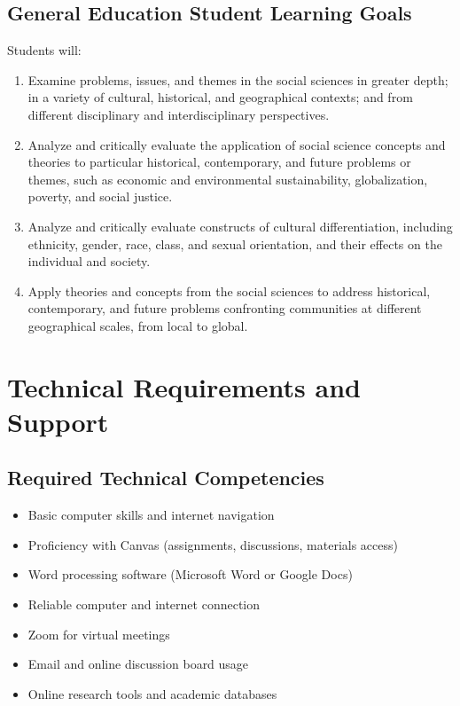 \documentclass[11pt]{scrartcl} %
\begin{document}
\subsection{General Education Student Learning Goals}
Students will:
\begin{enumerate}
\item Examine problems, issues, and themes in the social sciences in greater depth; in a variety of cultural, historical, and geographical contexts; and from different disciplinary and interdisciplinary perspectives.
\item Analyze and critically evaluate the application of social science concepts and theories to particular historical, contemporary, and future problems or themes, such as economic and environmental sustainability, globalization, poverty, and social justice.
\item Analyze and critically evaluate constructs of cultural differentiation, including ethnicity, gender, race, class, and sexual orientation, and their effects on the individual and society.
\item Apply theories and concepts from the social sciences to address historical, contemporary, and future problems confronting communities at different geographical scales, from local to global.
\end{enumerate}

\section{Technical Requirements and Support}

\subsection{Required Technical Competencies}
\begin{itemize}
\item Basic computer skills and internet navigation
\item Proficiency with Canvas (assignments, discussions, materials access)
\item Word processing software (Microsoft Word or Google Docs)
\item Reliable computer and internet connection
\item Zoom for virtual meetings
\item Email and online discussion board usage
\item Online research tools and academic databases
\end{itemize}
\end{document}
